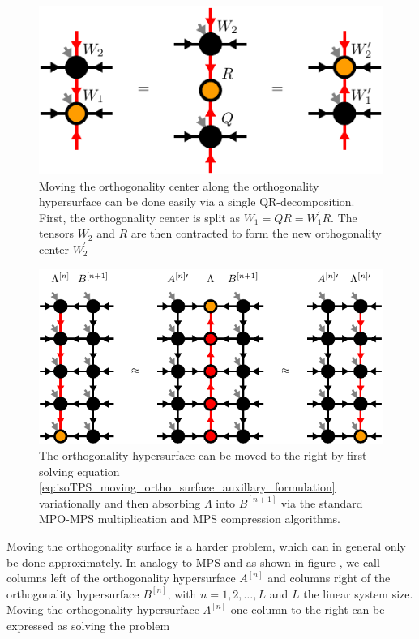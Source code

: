 \begin{figure}
	\centering
	\includegraphics[scale=1]{figures/tikz/Tensor_Networks/isoTPS_moving_ortho_center/isoTPS_moving_ortho_center.pdf}
	\caption{Moving the orthogonality center along the orthogonality hypersurface can be done easily via a single QR-decomposition. First, the orthogonality center is split as $W_1 = QR = W_1^\prime R$. The tensors $W_2$ and $R$ are then contracted to form the new orthogonality center $W_2^\prime$}
	\label{fig:isoTPS_moving_ortho_center}
\end{figure}
\begin{figure}
	\centering
	\includegraphics[scale=1]{figures/tikz/Tensor_Networks/isoTPS_moving_ortho_surface/isoTPS_moving_ortho_surface.pdf}
	\caption{The orthogonality hypersurface can be moved to the right by first solving equation \eqref{eq:isoTPS_moving_ortho_surface_auxillary_formulation} variationally and then absorbing $\Lambda$ into $B^{[n+1]}$ via the standard MPO-MPS multiplication and MPS compression algorithms.}
	\label{fig:isoTPS_moving_ortho_column}
\end{figure}
Moving the orthogonality surface is a harder problem, which can in general only be done approximately. In analogy to MPS and as shown in figure , we call columns left of the orthogonality hypersurface $A^{[n]}$ and columns right of the orthogonality hypersurface $B^{[n]}$, with $n = 1,2,\dots,L$ and $L$ the linear system size. Moving the orthogonality hypersurface $\Lambda^{[n]}$ one column to the right can be expressed as solving the problem
